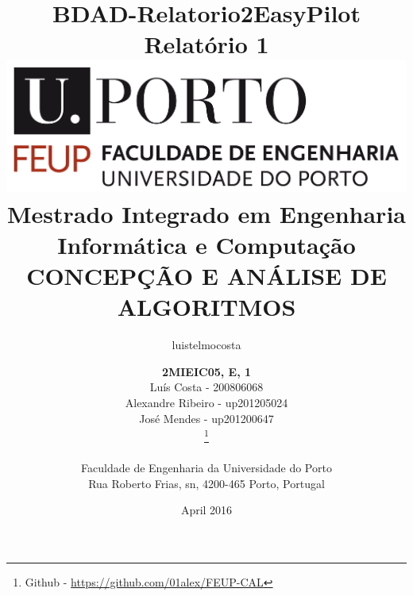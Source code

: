 \documentclass[a4paper]{article}
\title{BDAD-Relatorio2}
\author{luistelmocosta }
\date{April 2016}
\begin{document}
\title{\Huge\textbf{EasyPilot}\linebreak\linebreak
  \Large\textbf{Relatório 1}\linebreak\linebreak
  \linebreak\linebreak
  \includegraphics[scale=0.1]{feup-logo.png}\linebreak\linebreak
  \linebreak
  \Large{Mestrado Integrado em Engenharia Informática e Computação} \linebreak\linebreak
  \Large{CONCEPÇÃO E ANÁLISE DE ALGORITMOS}\linebreak
  }
  
  \author{\textbf{2MIEIC05, E, 1}\\
  Luís Costa -  200806068\\
  Alexandre Ribeiro - up201205024\\
  José Mendes - up201200647\\
  \footnote{Github - \url{https://github.com/01alex/FEUP-CAL}}
  \linebreak\linebreak \\
  \\ Faculdade de Engenharia da Universidade do Porto \\ Rua Roberto Frias, s\/n, 4200-465 Porto, Portugal \linebreak\linebreak\linebreak
  \linebreak\linebreak\vspace{1cm}}
  
  \maketitle

\thispagestyle{empty}
\end{document}
